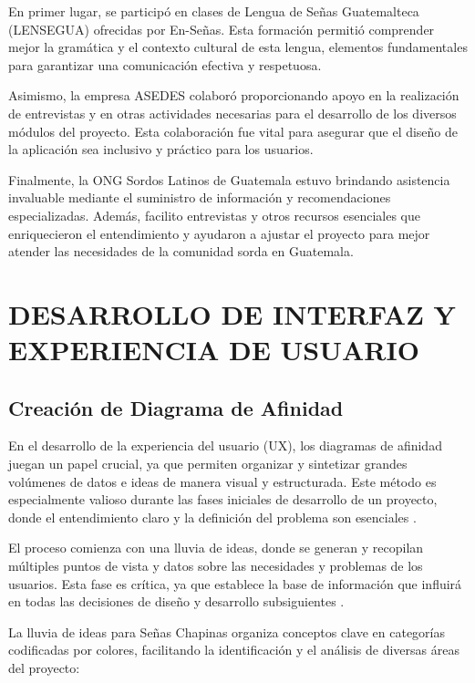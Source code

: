En primer lugar, se participó en clases de Lengua de Señas Guatemalteca (LENSEGUA) ofrecidas por En-Señas. Esta formación permitió comprender mejor la gramática y el contexto cultural de esta lengua, elementos fundamentales para garantizar una comunicación efectiva y respetuosa.

Asimismo, la empresa ASEDES colaboró proporcionando apoyo en la realización de entrevistas y en otras actividades necesarias para el desarrollo de los diversos módulos del proyecto. Esta colaboración fue vital para asegurar que el diseño de la aplicación sea inclusivo y práctico para los usuarios.

Finalmente, la ONG Sordos Latinos de Guatemala estuvo brindando asistencia invaluable mediante el suministro de información y recomendaciones especializadas. Además, facilito entrevistas y otros recursos esenciales que enriquecieron el entendimiento y ayudaron a ajustar el proyecto para mejor atender las necesidades de la comunidad sorda en Guatemala.

\section{DESARROLLO DE INTERFAZ Y EXPERIENCIA DE USUARIO}

\subsection{Creación de Diagrama de Afinidad}

En el desarrollo de la experiencia del usuario (UX), los diagramas de afinidad juegan un papel crucial, ya que permiten organizar y sintetizar grandes volúmenes de datos e ideas de manera visual y estructurada. Este método es especialmente valioso durante las fases iniciales de desarrollo de un proyecto, donde el entendimiento claro y la definición del problema son esenciales \cite{Maze2024}.

El proceso comienza con una lluvia de ideas, donde se generan y recopilan múltiples puntos de vista y datos sobre las necesidades y problemas de los usuarios. Esta fase es crítica, ya que establece la base de información que influirá en todas las decisiones de diseño y desarrollo subsiguientes \cite{Maze2024}.

La lluvia de ideas para Señas Chapinas organiza conceptos clave en categorías codificadas por colores, facilitando la identificación y el análisis de diversas áreas del proyecto:


